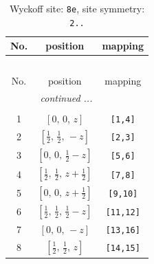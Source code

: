 \documentclass[fleqn,8pt]{jsarticle}
\begin{document}
\renewcommand{\arraystretch}{1.2}
\begin{longtable}{ccc}
\caption{Wyckoff site: {\tt 8e}, site symmetry: {\tt 2..}}
 \\
 \hline \hline
No. & position & mapping \\ \hline \endfirsthead

\multicolumn{2}{l}{\tablename\ \thetable{}} \\
 \hline \hline
No. & position & mapping \\ \hline \endhead

 \hline \hline
\multicolumn{2}{r}{\footnotesize\it continued ...} \\ \endfoot

 \hline \hline
\multicolumn{2}{r}{} \\ \endlastfoot

1 & $\left[ 0,\, 0,\, z \right]$ & {\tt [1,4]} \\ \hline
2 & $\left[ \frac{1}{2},\, \frac{1}{2},\, - z \right]$ & {\tt [2,3]} \\ \hline
3 & $\left[ 0,\, 0,\, \frac{1}{2} - z \right]$ & {\tt [5,6]} \\ \hline
4 & $\left[ \frac{1}{2},\, \frac{1}{2},\, z + \frac{1}{2} \right]$ & {\tt [7,8]} \\ \hline
5 & $\left[ 0,\, 0,\, z + \frac{1}{2} \right]$ & {\tt [9,10]} \\ \hline
6 & $\left[ \frac{1}{2},\, \frac{1}{2},\, \frac{1}{2} - z \right]$ & {\tt [11,12]} \\ \hline
7 & $\left[ 0,\, 0,\, - z \right]$ & {\tt [13,16]} \\ \hline
8 & $\left[ \frac{1}{2},\, \frac{1}{2},\, z \right]$ & {\tt [14,15]} \\
\end{longtable}
\renewcommand{\arraystretch}{1.2}
\end{document}
